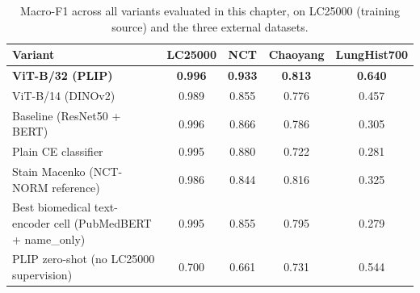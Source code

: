 \begin{table}[ht]
    \centering
    \small
    \begin{tabular}{|l|c|c|c|c|}
    \hline
    \textbf{Variant} & \textbf{LC25000} & \textbf{NCT} & \textbf{Chaoyang} & \textbf{LungHist700} \\ \hline
    \textbf{ViT-B/32 (PLIP)}                  & \textbf{0.996} & \textbf{0.933} & \textbf{0.813} & \textbf{0.640} \\ \hline
    ViT-B/14 (DINOv2)                          & 0.989 & 0.855 & 0.776 & 0.457 \\ \hline
    Baseline (ResNet50 + BERT)                & 0.996 & 0.866 & 0.786 & 0.305 \\ \hline
    Plain CE classifier                        & 0.995 & 0.880 & 0.722 & 0.281 \\ \hline
    Stain Macenko (NCT-NORM reference)        & 0.986 & 0.844 & 0.816 & 0.325 \\ \hline
    Best biomedical text-encoder cell (PubMedBERT + name\_only) & 0.995 & 0.855 & 0.795 & 0.279 \\ \hline
    PLIP zero-shot (no LC25000 supervision)   & 0.700 & 0.661 & 0.731 & 0.544 \\ \hline
    \end{tabular}
    \caption{Macro-F1 across all variants evaluated in this chapter, on LC25000 (training source) and the three external datasets.}
    \label{tab:summary-headline}
\end{table}
